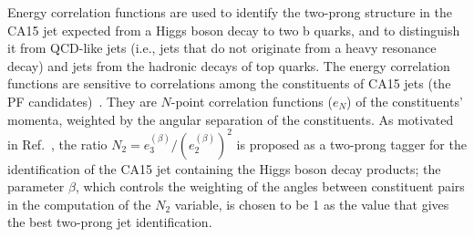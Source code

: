 
Energy correlation functions are used to identify the two-prong
structure in the CA15 jet expected from a Higgs boson decay to two b
quarks, and to distinguish it from QCD-like jets (i.e., jets that
do not originate from a heavy resonance decay) and jets from the hadronic decays of top quarks. The energy correlation functions are sensitive to correlations among the constituents
of CA15 jets (the PF candidates)~\cite{ecf}. They are $N$-point correlation functions ($e_N$) of the constituents' momenta, weighted by the angular separation of the constituents.
%                                                                                                                                                                                                
As motivated in Ref.~\cite{ecf}, the ratio $N_2 =
e_3^{(\beta)}/(e_2^{(\beta)})^2$ is proposed as a two-prong tagger for
the identification of the CA15 jet containing the Higgs boson decay
products; the parameter $\beta$, which controls the weighting of the angles between constituent pairs in the computation of
the $N_2$ variable, is chosen to be 1 as the value that gives the best two-prong jet identification. 



